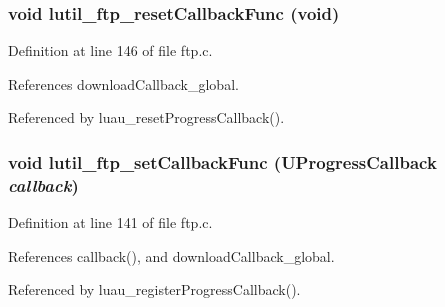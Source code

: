 \subsubsection{\setlength{\rightskip}{0pt plus 5cm}void lutil\_\-ftp\_\-reset\-Callback\-Func (void)}\label{ftp_8h_a4}




Definition at line 146 of file ftp.c.

References download\-Callback\_\-global.

Referenced by luau\_\-reset\-Progress\-Callback().
\subsubsection{\setlength{\rightskip}{0pt plus 5cm}void lutil\_\-ftp\_\-set\-Callback\-Func ({\bf UProgress\-Callback} {\em callback})}\label{ftp_8h_a3}




Definition at line 141 of file ftp.c.

References callback(), and download\-Callback\_\-global.

Referenced by luau\_\-register\-Progress\-Callback().